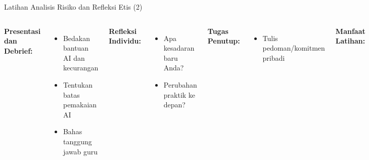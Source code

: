 \documentclass[aspectratio=169, table]{beamer}
\begin{document}
	
\begin{frame}[fragile]{Latihan Analisis Risiko dan Refleksi Etis (2)}
	\vspace{10pt}
	\begin{columns}[T]
		\textbf{Presentasi dan Debrief:}
		\begin{itemize}
			\item Bedakan bantuan AI dan kecurangan
			\item Tentukan batas pemakaian AI
			\item Bahas tanggung jawab guru
		\end{itemize}
		
		\vspace{3pt}
		\textbf{Refleksi Individu:}
		\begin{itemize}
			\item Apa kesadaran baru Anda?
			\item Perubahan praktik ke depan?
		\end{itemize}
		
		\textbf{Tugas Penutup:}
		\begin{itemize}
			\item Tulis pedoman/komitmen pribadi
		\end{itemize}
		
		\vspace{3pt}
		\textbf{Manfaat Latihan:}
		\begin{itemize}
			\item Bangun kesadaran etis dan kritis
			\item Kembangkan standar etika pribadi
			\item Guru sebagai teladan digital
		\end{itemize}
	\end{columns}
\end{frame}

	
	
		
\end{document}
